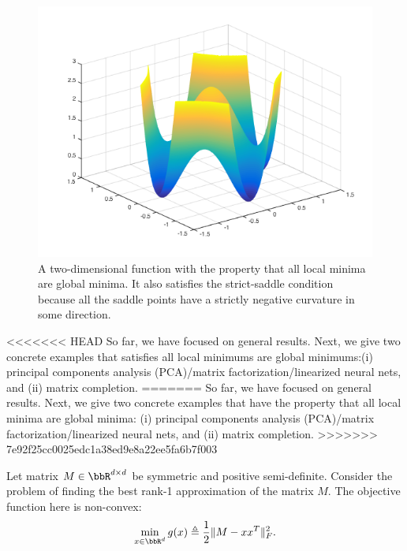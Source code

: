 \begin{definition} 
\begin{figure}[H]
    \centering
    \includegraphics[scale = 0.5]{figures/localmin.png}
    \caption{A two-dimensional function with the property that all local minima are global minima. It also satisfies the strict-saddle condition because all the saddle points have a strictly negative curvature in some direction.}
    \label{lec10:fig:strict-saddle}
\end{figure}

<<<<<<< HEAD
So far, we have focused on general results. Next, we give two concrete examples that satisfies all local minimums are global minimums:(i) principal components analysis (PCA)/matrix factorization/linearized neural nets, and (ii) matrix completion.
=======
So far, we have focused on general results. Next, we give two concrete examples that have the property that all local minima are global minima: (i) principal components analysis (PCA)/matrix factorization/linearized neural nets, and (ii) matrix completion.
>>>>>>> 7e92f25cc0025edc1a38ed9e8a22ee5fa6b7f003

Let matrix $M \in \bbR^{d \times d}$ be symmetric and positive semi-definite. Consider the problem of finding the best rank-1 approximation of the matrix $M$. The objective function here is non-convex:
\begin{equation}
    \min_{x \in \bbR^d}g(x) \triangleq \frac{1}{2}\|M - xx^T\|_F^2.
\end{equation}


\end{definition}

